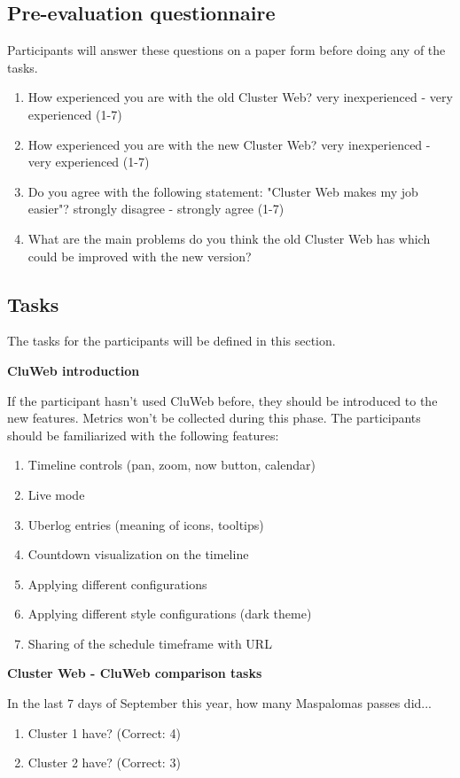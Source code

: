 \subsection{Pre-evaluation questionnaire} \label{pre-evaluation}
Participants will answer these questions on a paper form before doing any of the tasks.
\begin{enumerate}
\item How experienced you are with the old Cluster Web? very inexperienced - very experienced (1-7)
\item How experienced you are with the new Cluster Web? very inexperienced - very experienced (1-7)
\item Do you agree with the following statement: "Cluster Web makes my job easier"? strongly disagree - strongly agree (1-7)
\item What are the main problems do you think the old Cluster Web has which could be improved with the new version?
\end{enumerate}

\subsection{Tasks} \label{tasks_section}
The tasks for the participants will be defined in this section.

\textbf{CluWeb introduction}

If the participant hasn't used CluWeb before, they should be introduced to the new features. Metrics won't be collected during this phase. The participants should be familiarized with the following features:
\begin{enumerate}
\item Timeline controls (pan, zoom, now button, calendar)
\item Live mode
\item Uberlog entries (meaning of icons, tooltips)
\item Countdown visualization on the timeline
\item Applying different configurations
\item Applying different style configurations (dark theme)
\item Sharing of the schedule timeframe with URL
\end{enumerate}

\textbf{Cluster Web - CluWeb comparison tasks}

In the last 7 days of September this year, how many Maspalomas passes did...
\begin{enumerate}
\item Cluster 1 have? (Correct: 4)
\item Cluster 2 have? (Correct: 3)
\end{enumerate}

